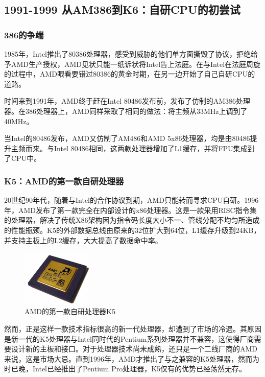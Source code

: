 \documentclass[UTF8]{ctexart}
\begin{document}
\subsection{1991-1999 从AM386到K6：自研CPU的初尝试}

\subsubsection{386的争端}
1985年，Intel推出了80386处理器，感受到威胁的他们单方面撕毁了协议，拒绝给予AMD生产授权，AMD见状只能一纸诉状将Intel告上法庭。在与Intel在法庭周旋的过程中，AMD眼看要错过80386的黄金时期，在另一边开始了自己自研CPU的道路。

时间来到1991年，AMD终于赶在Intel 80486发布前，发布了仿制的AM386处理器。在386处理器上，AMD同样采取了相同的做法：将主频从33MHz上调到了40MHz。

当Intel的80486发布，AMD又仿制了AM486和AMD 5x86处理器，均是由80486提升主频而来。与Intel 80486相同，这两款处理器增加了L1缓存，并将FPU集成到了CPU中。

\subsubsection{K5：AMD的第一款自研处理器}
20世纪90年代，随着与Intel的合作协议到期，AMD只能转而寻求CPU自研。1996年，AMD发布了第一款完全在内部设计的x86处理器。这是一款采用RISC指令集的处理器，解决了传统X86架构因为指令码长度大小不一、管线分配不均匀所造成的性能瓶颈。K5的外部数据总线由原来的32位扩大到64位，L1缓存升级到24KB，并支持主板上的L2缓存，大大提高了数据命中率。
\begin{figure}[H]
    \begin{center}
        \includegraphics[width=0.3\textwidth]{figure/K5.jpg}
        \caption{AMD的第一款自研处理器K5}
    \end{center}
\end{figure}
然而，正是这样一款技术指标很高的新一代处理器，却遭到了市场的冷遇。其原因是新一代的K5处理器与Intel同时代的Pentium系列处理器并不兼容，这使得厂商需要设计新的主板和接口。对于处理器技术尚未成熟，还只是一个二线厂商的AMD来说，这是市场大忌。直到1996年，AMD才推出了与之兼容的K5处理器，然而为时已晚，Intel已经推出了Pentium Pro处理器，K5仅有的优势已经荡然无存。
\end{document}
